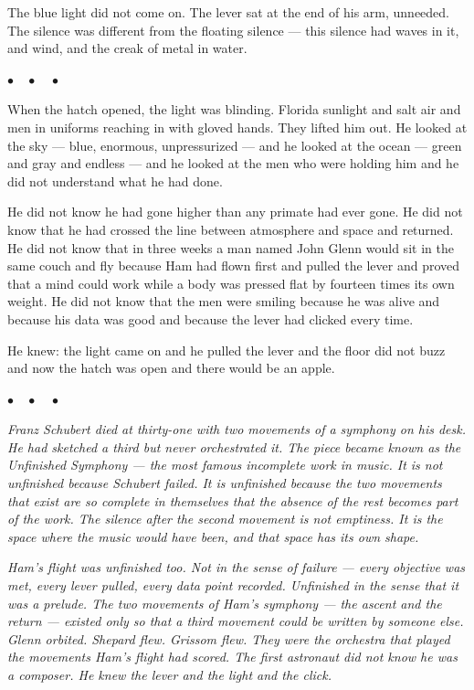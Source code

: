 \documentclass[12pt, letterpaper]{article}
\begin{document}
The blue light did not come on. The lever sat at the end of his arm, unneeded. The silence was different from the floating silence --- this silence had waves in it, and wind, and the creak of metal in water.

\begin{center}
$\bullet\quad\bullet\quad\bullet$
\end{center}

When the hatch opened, the light was blinding. Florida sunlight and salt air and men in uniforms reaching in with gloved hands. They lifted him out. He looked at the sky --- blue, enormous, unpressurized --- and he looked at the ocean --- green and gray and endless --- and he looked at the men who were holding him and he did not understand what he had done.

He did not know he had gone higher than any primate had ever gone. He did not know that he had crossed the line between atmosphere and space and returned. He did not know that in three weeks a man named John Glenn would sit in the same couch and fly because Ham had flown first and pulled the lever and proved that a mind could work while a body was pressed flat by fourteen times its own weight. He did not know that the men were smiling because he was alive and because his data was good and because the lever had clicked every time.

He knew: the light came on and he pulled the lever and the floor did not buzz and now the hatch was open and there would be an apple.

\begin{center}
$\bullet\quad\bullet\quad\bullet$
\end{center}

\textit{Franz Schubert died at thirty-one with two movements of a symphony on his desk. He had sketched a third but never orchestrated it. The piece became known as the Unfinished Symphony --- the most famous incomplete work in music. It is not unfinished because Schubert failed. It is unfinished because the two movements that exist are so complete in themselves that the absence of the rest becomes part of the work. The silence after the second movement is not emptiness. It is the space where the music would have been, and that space has its own shape.}

\textit{Ham's flight was unfinished too. Not in the sense of failure --- every objective was met, every lever pulled, every data point recorded. Unfinished in the sense that it was a prelude. The two movements of Ham's symphony --- the ascent and the return --- existed only so that a third movement could be written by someone else. Glenn orbited. Shepard flew. Grissom flew. They were the orchestra that played the movements Ham's flight had scored. The first astronaut did not know he was a composer. He knew the lever and the light and the click.}
\end{document}
